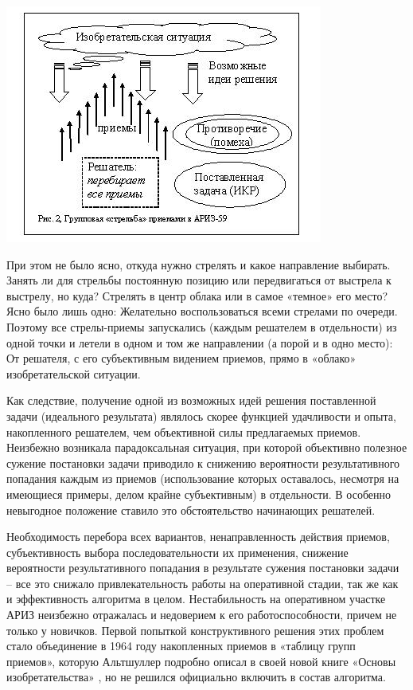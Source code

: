 \documentclass[11pt,a4paper]{article}
\begin{document}
\begin{center}
  \includegraphics[width=.7\textwidth]{./9.jpg}
\end{center}

При этом не было ясно, откуда нужно стрелять и какое направление выбирать.
Занять ли для стрельбы постоянную позицию или передвигаться от выстрела к
выстрелу, но куда? Стрелять в центр облака или в самое «темное» его место?
Ясно было лишь одно: Желательно воспользоваться всеми стрелами по очереди.
Поэтому все стрелы-приемы запускались (каждым решателем в отдельности) из
одной точки и летели в одном и том же направлении (а порой и в одно место): От
решателя, с его субъективным видением приемов, прямо в «облако»
изобретательской ситуации.

Как следствие, получение одной из возможных идей решения поставленной задачи
(идеального результата) являлось скорее функцией удачливости и опыта,
накопленного решателем, чем объективной силы предлагаемых приемов. Неизбежно
возникала парадоксальная ситуация, при которой объективно полезное сужение
постановки задачи приводило к снижению вероятности результативного попадания
каждым из приемов (использование которых оставалось, несмотря на имеющиеся
примеры, делом крайне субъективным) в отдельности. В особенно невыгодное
положение ставило это обстоятельство начинающих решателей.

Необходимость перебора всех вариантов, ненаправленность действия приемов,
субъективность выбора последовательности их применения, снижение вероятности
результативного попадания в результате сужения постановки задачи -- все это
снижало привлекательность работы на оперативной стадии, так же как и
эффективность алгоритма в целом. Нестабильность на оперативном участке АРИЗ
неизбежно отражалась и недоверием к его работоспособности, причем не только у
новичков. Первой попыткой конструктивного решения этих проблем стало
объединение в 1964 году накопленных приемов в «таблицу групп приемов», которую
Альтшуллер подробно описал в своей новой книге «Основы изобретательства»
\cite{Altshuller1964}, но не решился официально включить в состав алгоритма.
\clearpage
\end{document}
